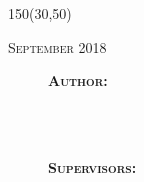 \begin{titlepage}
\begin{center}

\large

\setlength{\TPHorizModule}{1mm}
\setlength{\TPVertModule}{\TPHorizModule}
\newlength{\backupparindent}
\setlength{\backupparindent}{\parindent}
\setlength{\parindent}{0mm}			
\begin{textblock}{150}(30,50)
    \vspace*{15mm}
    \Huge
    \vspace{4cm}
    \textcolor{OpenlabBlue}{\textbf{\doctitle }}\\
    \Large
    \vspace*{5mm}


    \begin{flushleft}
        \textcolor{OpenlabDarkBlue}{\textsc{September 2018}}\\
        \large
	
    \end{flushleft}
    \vspace*{1in}
    \begin{figure}
        \raggedleft
    \begin{minipage}[r]{0.2 \textwidth} %
   \begin{flushleft}                     %
	\textsc{\textbf{Author:}}\\
    \me\\\bigskip\bigskip

   \normalsize
    \department\\\bigskip\bigskip
    
    \textsc{\textbf{Supervisors:}}\\\medskip
    \firstCommitteeMember\\
    \secondCommitteeMember\\
   \end{flushleft}


\end{minipage}
\end{figure}
\end{textblock}
\end{center}
\end{titlepage}
